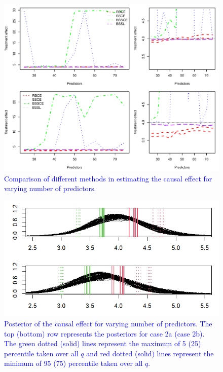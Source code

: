 \documentclass[preprint,12pt]{elsarticle}
\newcommand{\added}[1]{\textcolor{blue}{#1}}
\begin{document}
\begin{figure}
    \centering
    \includegraphics[width = 0.9\linewidth]{treat_pred_rev.pdf}
    \caption{\added{Comparison of different methods in estimating the causal effect for varying number of predictors.}}
    \label{fig:comp:trt:pred}
\end{figure}

\begin{figure}
	\centering
	\includegraphics[width = 0.95\linewidth]{treat_post_pred.png}
	\caption{\added{Posterior of the causal effect for varying number of predictors. The top (bottom) row
			represents the posteriors for case 2a (case 2b). The green dotted (solid) lines represent the maximum of 5 (25) percentile taken over all $q$ and red dotted (solid) lines represent the minimum of 95 (75) percentile taken over all $q$. }}
	\label{fig:post:trt:pred}
\end{figure}
\end{document}
